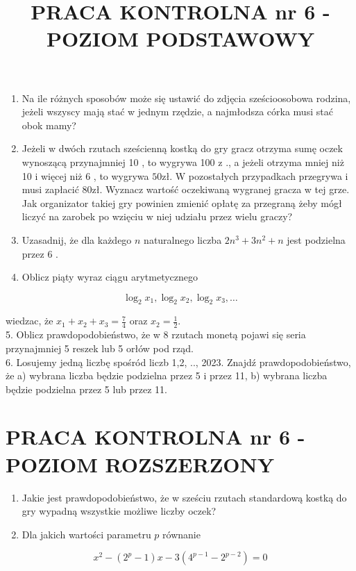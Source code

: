 \documentclass[10pt]{article}
\title{PRACA KONTROLNA nr 6 - POZIOM PODSTAWOWY }
\author{}
\date{}
\begin{document}
\maketitle
\begin{enumerate}
  \item Na ile różnych sposobów może się ustawić do zdjęcia sześcioosobowa rodzina, jeżeli wszyscy mają stać w jednym rzędzie, a najmłodsza córka musi stać obok mamy?
  \item Jeżeli w dwóch rzutach sześcienną kostką do gry gracz otrzyma sumę oczek wynoszącą przynajmniej 10 , to wygrywa 100 z ., a jeżeli otrzyma mniej niż 10 i więcej niż 6 , to wygrywa $50 \mathrm{zł}$. W pozostałych przypadkach przegrywa i musi zapłacić 80zł. Wyznacz wartość oczekiwaną wygranej gracza w tej grze. Jak organizator takiej gry powinien zmienić opłatę za przegraną żeby mógł liczyć na zarobek po wzięciu w niej udziału przez wielu graczy?
  \item Uzasadnij, że dla każdego $n$ naturalnego liczba $2 n^{3}+3 n^{2}+n$ jest podzielna przez 6 .
  \item Oblicz piąty wyraz ciągu arytmetycznego
\end{enumerate}

$$
\log _{2} x_{1}, \log _{2} x_{2}, \log _{2} x_{3}, \ldots
$$

wiedzac, że $x_{1}+x_{2}+x_{3}=\frac{7}{4}$ oraz $x_{2}=\frac{1}{2}$.\\
5. Oblicz prawdopodobieństwo, że w 8 rzutach monetą pojawi się seria przynajmniej 5 reszek lub 5 orłów pod rząd.\\
6. Losujemy jedną liczbę spośród liczb 1,2, .., 2023. Znajdź prawdopodobieństwo, że a) wybrana liczba będzie podzielna przez 5 i przez 11, b) wybrana liczba będzie podzielna przez 5 lub przez 11.

\section*{PRACA KONTROLNA nr 6 - POZIOM ROZSZERZONY}
\begin{enumerate}
  \item Jakie jest prawdopodobieństwo, że w sześciu rzutach standardową kostką do gry wypadną wszystkie możliwe liczby oczek?
  \item Dla jakich wartości parametru $p$ równanie
\end{enumerate}

$$
x^{2}-\left(2^{p}-1\right) x-3\left(4^{p-1}-2^{p-2}\right)=0
$$
\end{document}
